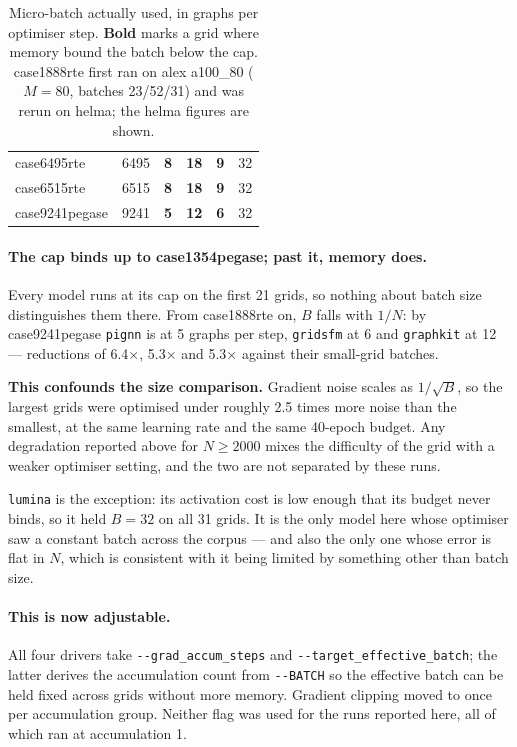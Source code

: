 \documentclass[10pt]{article}
\begin{document}
\begin{table}[H]
\begin{tabular}{lr rrrr}
case6495rte & 6495 & \textbf{8} & \textbf{18} & \textbf{9} & 32 \\
case6515rte & 6515 & \textbf{8} & \textbf{18} & \textbf{9} & 32 \\
case9241pegase & 9241 & \textbf{5} & \textbf{12} & \textbf{6} & 32 \\
\bottomrule
\end{tabular}
\caption{Micro-batch actually used, in graphs per optimiser step. \textbf{Bold}
marks a grid where memory bound the batch below the cap. case1888rte first ran
on alex a100\_80 ($M{=}80$, batches 23/52/31) and was rerun on helma; the helma
figures are shown.}
\end{table}

\paragraph{The cap binds up to case1354pegase; past it, memory does.} Every
model runs at its cap on the first 21 grids, so nothing about batch size
distinguishes them there. From case1888rte on, $B$ falls with $1/N$: by
case9241pegase \texttt{pignn} is at 5 graphs per step, \texttt{gridsfm} at 6 and
\texttt{graphkit} at 12 --- reductions of 6.4$\times$, 5.3$\times$ and
5.3$\times$ against their small-grid batches.

\textbf{This confounds the size comparison.} Gradient noise scales as
$1/\sqrt{B}$, so the largest grids were optimised under roughly 2.5 times more
noise than the smallest, at the same learning rate and the same 40-epoch budget.
Any degradation reported above for $N \geq 2000$ mixes the difficulty of the
grid with a weaker optimiser setting, and the two are not separated by these
runs.

\texttt{lumina} is the exception: its activation cost is low enough that its
budget never binds, so it held $B=32$ on all 31 grids. It is the only model here
whose optimiser saw a constant batch across the corpus --- and also the only one
whose error is flat in $N$, which is consistent with it being limited by
something other than batch size.

\paragraph{This is now adjustable.} All four drivers take
\texttt{-{}-grad\_accum\_steps} and \texttt{-{}-target\_effective\_batch};
the latter derives the accumulation count from \texttt{-{}-BATCH} so the
effective batch can be held fixed across grids without more memory. Gradient
clipping moved to once per accumulation group. Neither flag was used for the
runs reported here, all of which ran at accumulation 1.
\end{document}
